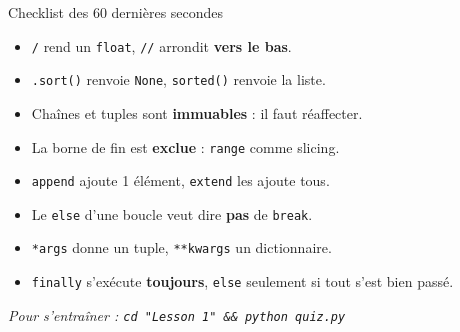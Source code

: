 \documentclass[a4paper,10pt]{article}
\newcommand{\co}[1]{\texttt{\textcolor{codefg}{#1}}}
\begin{document}
\vspace{0.3em}
\begin{astucebox}{Checklist des 60 dernières secondes}
\begin{minipage}[t]{0.485\linewidth}
\begin{itemize}
  \item \co{/} rend un \co{float}, \co{//} arrondit \textbf{vers le bas}.
  \item \co{.sort()} renvoie \co{None}, \co{sorted()} renvoie la liste.
  \item Chaînes et tuples sont \textbf{immuables} : il faut réaffecter.
  \item La borne de fin est \textbf{exclue} : \co{range} comme slicing.
\end{itemize}
\end{minipage}\hfill
\begin{minipage}[t]{0.485\linewidth}
\begin{itemize}
  \item \co{append} ajoute 1 élément, \co{extend} les ajoute tous.
  \item Le \co{else} d'une boucle veut dire \textbf{pas} de \co{break}.
  \item \co{*args} donne un tuple, \co{**kwargs} un dictionnaire.
  \item \co{finally} s'exécute \textbf{toujours}, \co{else} seulement si tout
        s'est bien passé.
\end{itemize}
\end{minipage}
\end{astucebox}

\vspace{0.4em}
\begin{center}
\footnotesize\itshape
Pour s'entraîner : \texttt{cd "Lesson 1" \&\& python quiz.py}
\end{center}
\end{document}
